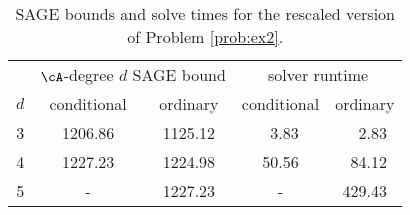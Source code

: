 \begin{table}[ht!]
    \caption{SAGE bounds and solve times for the rescaled version of Problem \eqref{prob:ex2}.}
    \centering
    \begin{tabular}{c|cc|cc|} %
     & \multicolumn{2}{c}{$\cA$-degree $d$ SAGE bound} & \multicolumn{2}{|c|}{solver runtime} \\ 
    $d$ & conditional & ordinary & conditional & ordinary  \\ \hline
      3 & 1206.86 & 1125.12 & \textcolor{white}{2}3.83 & \textcolor{white}{22}2.83  \\
      4 & 1227.23 & 1224.98 & 50.56 & \textcolor{white}{2}84.12  \\
      5 & - & 1227.23 & - & 429.43 \\
    \end{tabular}
    \label{tab:ex2:rescaled}
\end{table}